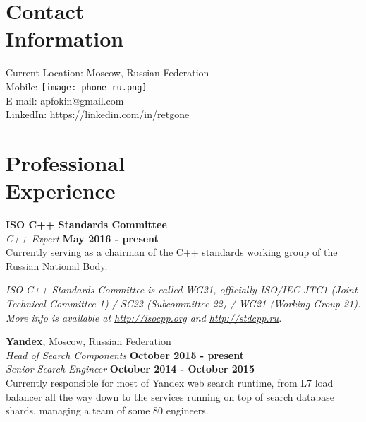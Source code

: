 \documentclass[margin,line]{CV}
\begin{document}
\begin{resume}


    \section{\mysidestyle Contact\\Information}
    Current Location: Moscow, Russian Federation \\
    Mobile: \texttt{[image: phone-ru.png]} \\ 
    E-mail: apfokin@gmail.com \\
    LinkedIn: \url{https://linkedin.com/in/retgone}

    \section{\mysidestyle Professional\\Experience}
    \textbf{ISO C++ Standards Committee} \vspace{2mm}\\\vspace{1mm}%
    \textsl{C++ Expert} \hfill \textbf{May 2016 - present}\\\vspace{1mm}%
    Currently serving as a chairman of the C++ standards working group of the Russian National Body.

\ifdefined\superofficial
    {\footnotesize\textit{ISO C++ Standards Committee is called WG21, officially ISO/IEC JTC1 (Joint Technical Committee 1) / SC22 (Subcommittee 22) / WG21 (Working Group 21). More info is available at \url{http://isocpp.org} and \url{http://stdcpp.ru}.}}
\fi
    
    \textbf{Yandex}, Moscow, Russian Federation \vspace{2mm}\\\vspace{1mm}%
    \textsl{Head of Search Components} \hfill \textbf{October 2015 - present}\\\vspace{1mm}%
    \textsl{Senior Search Engineer} \hfill \textbf{October 2014 - October 2015}\\
    Currently responsible for most of Yandex web search runtime, from L7 load balancer all the way down to the services running on top of search database shards, managing a team of some 80 engineers.
    

\end{resume}
\end{document}
